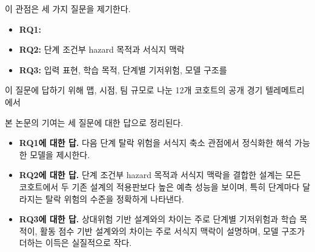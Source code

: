 이 관점은 세 가지 질문을 제기한다.
\begin{itemize}
    \item \textbf{RQ1:}

    \item \textbf{RQ2:}
    단계 조건부 hazard 목적과 서식지 맥락 

    \item \textbf{RQ3:}
    입력 표현, 학습 목적, 단계별 기저위험, 모델 구조를 
\end{itemize}

이 질문에 답하기 위해 맵, 시점, 팀 규모로 나눈 12개 코호트의 공개 경기 텔레메트리에서 

본 논문의 기여는 세 질문에 대한 답으로 정리된다.
\begin{itemize}
    \item \textbf{RQ1에 대한 답.}
    다음 단계 탈락 위험을 서식지 축소 관점에서 정식화한 해석 가능한 모델을 제시한다.

    \item \textbf{RQ2에 대한 답.}
    단계 조건부 hazard 목적과 서식지 맥락을 결합한 설계는 모든 코호트에서 두 기존 설계의 적용판보다 높은 예측 성능을 보이며, 특히 단계마다 달라지는 탈락 위험의 수준을 정확하게 나타낸다.

    \item \textbf{RQ3에 대한 답.}
    상대위험 기반 설계와의 차이는 주로 단계별 기저위험과 학습 목적이, 활동 점수 기반 설계와의 차이는 주로 서식지 맥락이 설명하며, 모델 구조가 더하는 이득은 실질적으로 작다.
\end{itemize}
